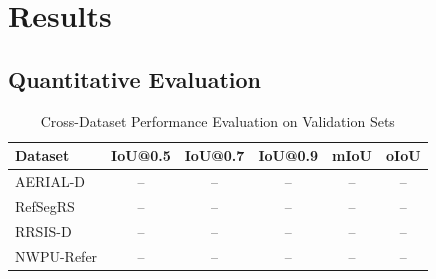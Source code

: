 \section{Results}

\subsection{Quantitative Evaluation}

\begin{table}[H]
\centering
\caption{Cross-Dataset Performance Evaluation on Validation Sets}
\label{tab:cross_dataset_results}
\begin{tabular}{@{}lccccc@{}}
\toprule
\textbf{Dataset} & \textbf{IoU@0.5} & \textbf{IoU@0.7} & \textbf{IoU@0.9} & \textbf{mIoU} & \textbf{oIoU} \\
\midrule
AERIAL-D & -- & -- & -- & -- & -- \\
RefSegRS & -- & -- & -- & -- & -- \\
RRSIS-D & -- & -- & -- & -- & -- \\
NWPU-Refer & -- & -- & -- & -- & -- \\
\bottomrule
\end{tabular}
\end{table}

\begin{table}[H]
\centering
\caption{Comparison with Existing RRSIS Datasets}
\label{tab:dataset_comparison}
\end{table}

